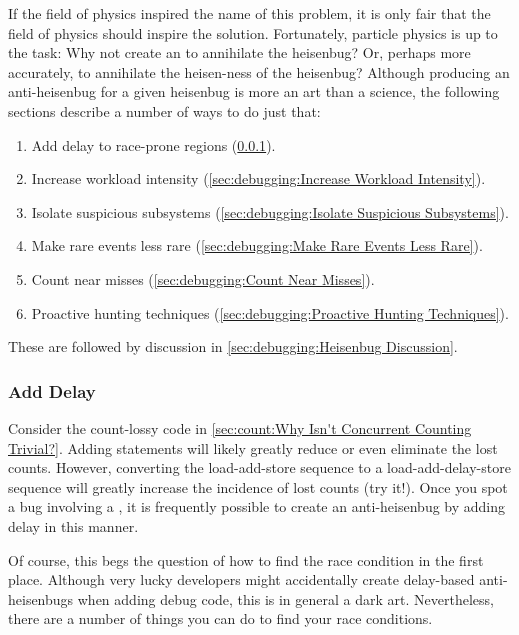 If the field of physics inspired the name of this problem, it is only
fair that the field of physics should inspire the solution.
Fortunately, particle physics is up to the task:
Why not create an 
to annihilate the heisenbug?
Or, perhaps more accurately, to annihilate the heisen-ness of
the heisenbug?
Although producing an anti-heisenbug for a given heisenbug is more an
art than a science, the following sections describe a number of ways to
do just that:

\begin{enumerate}
\item	Add delay to race-prone regions (\cref{sec:debugging:Add Delay}).
\item	Increase workload intensity
	(\cref{sec:debugging:Increase Workload Intensity}).
\item	Isolate suspicious subsystems
	(\cref{sec:debugging:Isolate Suspicious Subsystems}).
\item	Make rare events less rare
	(\cref{sec:debugging:Make Rare Events Less Rare}).
\item	Count near misses (\cref{sec:debugging:Count Near Misses}).
\item	Proactive hunting techniques
	(\cref{sec:debugging:Proactive Hunting Techniques}).
\end{enumerate}

These are followed by discussion in
\cref{sec:debugging:Heisenbug Discussion}.

\subsubsection{Add Delay}
\label{sec:debugging:Add Delay}

Consider the count-lossy code in
\cref{sec:count:Why Isn't Concurrent Counting Trivial?}.
Adding  statements will likely greatly reduce or even
eliminate the lost counts.
However, converting the load-add-store sequence to a load-add-delay-store
sequence will greatly increase the incidence of lost counts (try it!).
Once you spot a bug involving a , it is frequently possible
to create an anti-heisenbug by adding delay in this manner.

Of course, this begs the question of how to find the race condition in
the first place.
Although very lucky developers might accidentally create delay-based
anti-heisenbugs when adding debug code, this is in general a dark art.
Nevertheless, there are a number of things you can do to find your race
conditions.

